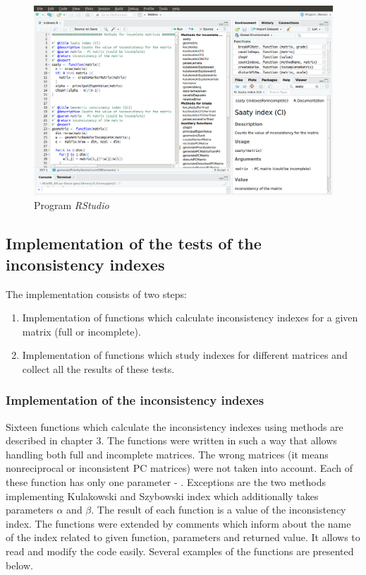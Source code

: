 \begin{figure}[!]
\centerline{\includegraphics[width=\textwidth]{images/rstudio.png}}
\caption{Program \textit{RStudio}}
\label{fig:rstudio}
\end{figure}

\subsection{Implementation of the tests of the inconsistency indexes}
The implementation consists of two steps:
\begin{enumerate}
  \item Implementation of functions which calculate inconsistency indexes for a given matrix (full or incomplete).
  \item Implementation of functions which study indexes for different matrices and collect all the results of these tests. 
\end{enumerate}

\subsubsection{Implementation of the inconsistency indexes}
Sixteen functions which calculate the inconsistency indexes using methods are described in chapter 3. The functions were written in such a way that allows handling both full and incomplete matrices. The wrong matrices (it means nonreciprocal or inconsistent PC matrices) were not taken into account. Each of these function has only one parameter - . Exceptions are the two methods implementing Kulakowski and Szybowski index which additionally takes parameters $\alpha$ and $\beta$. The result of each function is a value of the inconsistency index. The functions were extended by comments which inform about the name of the index related to given function, parameters and returned value. It allows to read and modify the code easily. Several examples of the functions are presented below.

